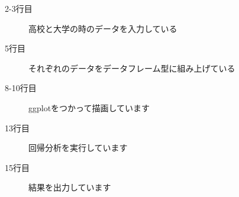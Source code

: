 \begin{description}
   \item[2-3行目] 高校と大学の時のデータを入力している
   \item[5行目] それぞれのデータをデータフレーム型に組み上げている
   \item[8-10行目] ggplotをつかって描画しています
   \item[13行目] 回帰分析を実行しています
   \item[15行目] 結果を出力しています
\end{description}
